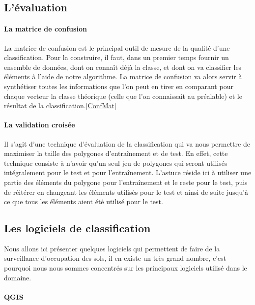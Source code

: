 \documentclass[a4paper,10pt]{report}
\begin{document}
\subsection{L'évaluation}
\paragraph{La matrice de confusion\newline}
La matrice de confusion est le principal outil de mesure de la qualité d'une classification. Pour la construire, il faut, dans un premier temps fournir un ensemble de données, dont on connaît déjà la classe, et dont on va classifier les éléments à l'aide de notre algorithme. La matrice de confusion va alors servir à synthétiser toutes les informations que l'on peut en tirer en comparant pour chaque vecteur la classe théorique (celle que l'on connaissait au préalable) et le résultat de la classification.\ref{ConfMat}

\paragraph{La validation croisée\newline}
Il s'agit d'une technique d'évaluation de la classification qui va nous permettre de maximiser la taille des polygones d'entraînement et de test. En effet, cette technique consiste à n'avoir qu'un seul jeu de polygones qui seront utilisés intégralement pour le test et pour l'entraînement. L'astuce réside ici à utiliser une partie des éléments du polygone pour l'entraînement et le reste pour le test, puis de réitérer en changeant les éléments utilisés pour le test et ainsi de suite jusqu'à ce que tous les éléments aient été utilisé pour le test.

\subsection{Les logiciels de classification}
Nous allons ici présenter quelques logiciels qui permettent de faire de la surveillance d'occupation des sols, il en existe un très grand nombre, c'est pourquoi nous nous sommes concentrés sur les principaux logiciels utilisé dans le domaine.
\paragraph{QGIS}
\end{document}
